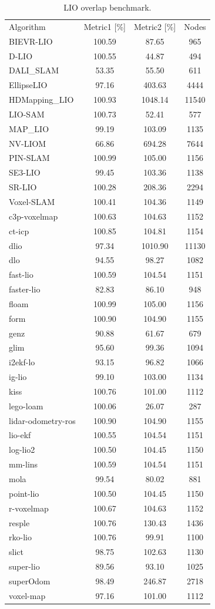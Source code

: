 \begin{table}[]
\centering
\begin{tabular}{lccc}
\rowcolor[HTML]{C0C0C0}
Algorithm & Metric1 [\%] & Metric2 [\%] & Nodes \\
BIEVR-LIO & 100.59 & 87.65 & 965 \\
D-LIO & 100.55 & 44.87 & 494 \\
DALI_SLAM & 53.35 & 55.50 & 611 \\
EllipseLIO & 97.16 & 403.63 & 4444 \\
HDMapping_LIO & 100.93 & 1048.14 & 11540 \\
LIO-SAM & 100.73 & 52.41 & 577 \\
MAP_LIO & 99.19 & 103.09 & 1135 \\
NV-LIOM & 66.86 & 694.28 & 7644 \\
PIN-SLAM & 100.99 & 105.00 & 1156 \\
SE3-LIO & 99.45 & 103.36 & 1138 \\
SR-LIO & 100.28 & 208.36 & 2294 \\
Voxel-SLAM & 100.41 & 104.36 & 1149 \\
c3p-voxelmap & 100.63 & 104.63 & 1152 \\
ct-icp & 100.85 & 104.81 & 1154 \\
dlio & 97.34 & 1010.90 & 11130 \\
dlo & 94.55 & 98.27 & 1082 \\
fast-lio & 100.59 & 104.54 & 1151 \\
faster-lio & 82.83 & 86.10 & 948 \\
floam & 100.99 & 105.00 & 1156 \\
form & 100.90 & 104.90 & 1155 \\
genz & 90.88 & 61.67 & 679 \\
glim & 95.60 & 99.36 & 1094 \\
i2ekf-lo & 93.15 & 96.82 & 1066 \\
ig-lio & 99.10 & 103.00 & 1134 \\
kiss & 100.76 & 101.00 & 1112 \\
lego-loam & 100.06 & 26.07 & 287 \\
lidar-odometry-ros & 100.90 & 104.90 & 1155 \\
lio-ekf & 100.55 & 104.54 & 1151 \\
log-lio2 & 100.50 & 104.45 & 1150 \\
mm-lins & 100.59 & 104.54 & 1151 \\
mola & 99.54 & 80.02 & 881 \\
point-lio & 100.50 & 104.45 & 1150 \\
r-voxelmap & 100.67 & 104.63 & 1152 \\
resple & 100.76 & 130.43 & 1436 \\
rko-lio & 100.76 & 99.91 & 1100 \\
slict & 98.75 & 102.63 & 1130 \\
super-lio & 89.56 & 93.10 & 1025 \\
superOdom & 98.49 & 246.87 & 2718 \\
voxel-map & 97.16 & 101.00 & 1112 \\
\end{tabular}
\caption{LIO overlap benchmark.}
\label{tab:lio_overlap}
\end{table}